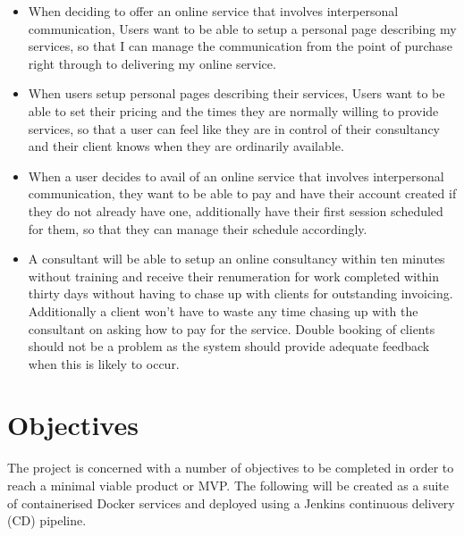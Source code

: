 \begin{itemize}
\item When deciding to offer an online service that involves interpersonal communication, Users want to be able to setup a personal page describing my services, so that I can manage the communication from the point of purchase right through to delivering my online service.
\item When users setup personal pages describing their services, Users want to be able to set their pricing and the times they are normally willing to provide services, so that a user can feel like they are in control of their consultancy and their client knows when they are ordinarily available.
\item When a user decides to avail of an online service that involves interpersonal communication, they want to be able to pay and have their account created if they do not already have one, additionally have their first session scheduled for them, so that they can manage their schedule accordingly.
\item A consultant will be able to setup an online consultancy within ten minutes without training and receive their renumeration for work completed within thirty days without having to chase up with clients for outstanding invoicing.  Additionally a client won’t have to waste any time chasing up with the consultant on asking how to pay for the service.  Double booking of clients should not be a problem as the system should provide adequate feedback when this is likely to occur. 
\end{itemize}

\section{Objectives}

The project is concerned with a number of objectives to be completed in order to reach a minimal viable product or MVP. The following will be created as a suite of containerised Docker\cite{Docker} services and deployed using a Jenkins continuous delivery (CD) pipeline\cite{jenkinspipeline}.

